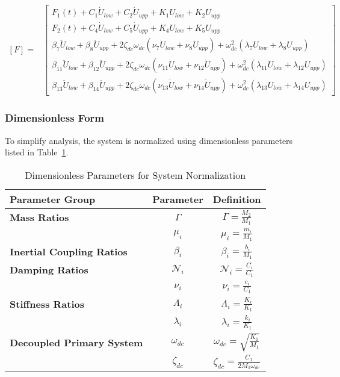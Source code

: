 \documentclass[12pt,a4paper]{article}
\begin{document}
\begin{equation}\label{Eq.force_vector_dimensional_combined}
\begin{aligned}
[F] = & \begin{bmatrix}
F_1(t) + C_1 \dot{U}_{low} + C_2 \dot{U}_{upp} + K_1 U_{low} + K_2 U_{upp} \\
F_2(t) + C_4 \dot{U}_{low} + C_5 \dot{U}_{upp} + K_4 U_{low} + K_5 U_{upp} \\
\beta_7 \ddot{U}_{low} + \beta_8 \ddot{U}_{upp} + 2 \zeta_{dc} \omega_{dc} (\nu_7 \dot{U}_{low} + \nu_8 \dot{U}_{upp}) + \omega_{dc}^2 (\lambda_7 U_{low} + \lambda_8 U_{upp}) \\
\beta_{11} \ddot{U}_{low} + \beta_{12} \ddot{U}_{upp} + 2 \zeta_{dc} \omega_{dc} (\nu_{11} \dot{U}_{low} + \nu_{12} \dot{U}_{upp}) + \omega_{dc}^2 (\lambda_{11} U_{low} + \lambda_{12} U_{upp}) \\
\beta_{13} \ddot{U}_{low} + \beta_{14} \ddot{U}_{upp} + 2 \zeta_{dc} \omega_{dc} (\nu_{13} \dot{U}_{low} + \nu_{14} \dot{U}_{upp}) + \omega_{dc}^2 (\lambda_{13} U_{low} + \lambda_{14} U_{upp})
\end{bmatrix}
\end{aligned}
\end{equation}

\subsubsection{Dimensionless Form}

To simplify analysis, the system is normalized using dimensionless parameters listed in Table~\ref{Tab:dimensionless.table}.


\begin{table}[h!]
\centering
\caption{Dimensionless Parameters for System Normalization}
\label{Tab:dimensionless.table}
\begin{tabular}{lcc}
\toprule
\textbf{Parameter Group} & \textbf{Parameter} & \textbf{Definition} \\
\midrule
\textbf{Mass Ratios} & \( \Gamma \) & \( \Gamma = \frac{M_2}{M_1} \) \\
 & \( \mu_i \) & \( \mu_i = \frac{m_i}{M_1} \) \\
\addlinespace
\textbf{Inertial Coupling Ratios} & \( \beta_i \) & \( \beta_i = \frac{b_i}{M_1} \) \\
\addlinespace
\textbf{Damping Ratios} & \( \mathcal{N}_i \) & \( \mathcal{N}_i = \frac{C_i}{C_1} \) \\
 & \( \nu_i \) & \( \nu_i = \frac{c_i}{C_1} \) \\
\addlinespace
\textbf{Stiffness Ratios} & \( \Lambda_i \) & \( \Lambda_i = \frac{K_i}{K_1} \) \\
 & \( \lambda_i \) & \( \lambda_i = \frac{k_i}{K_1} \) \\
\addlinespace
\textbf{Decoupled Primary System} & \( \omega_{dc} \) & \( \omega_{dc} = \sqrt{\frac{K_1}{M_1}} \) \\
 & \( \zeta_{dc} \) & \( \zeta_{dc} = \frac{C_1}{2 M_1 \omega_{dc}} \) \\
\bottomrule
\end{tabular}
\end{table}
\end{document}
